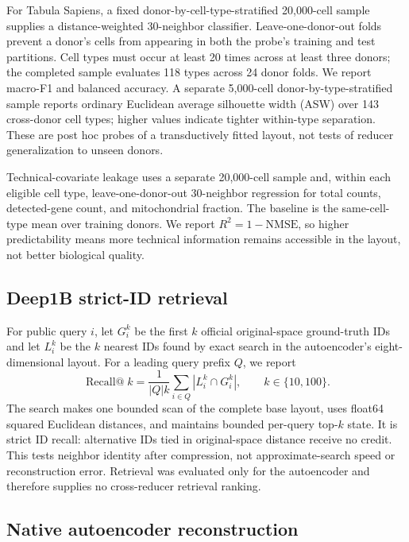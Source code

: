 \documentclass[10pt]{article}
\begin{document}
For Tabula Sapiens, a fixed donor-by-cell-type-stratified 20,000-cell sample supplies a
distance-weighted 30-neighbor classifier.  Leave-one-donor-out folds prevent a donor's
cells from appearing in both the probe's training and test partitions.  Cell types must
occur at least 20 times across at least three donors; the completed sample evaluates 118
types across 24 donor folds.  We report macro-F1 and balanced accuracy.  A separate
5,000-cell donor-by-type-stratified sample reports ordinary Euclidean average silhouette
width (ASW) over 143 cross-donor cell types; higher values indicate tighter
within-type separation.  These are post hoc probes of a transductively fitted layout,
not tests of reducer generalization to unseen donors.

Technical-covariate leakage uses a separate 20,000-cell sample and, within each eligible
cell type, leave-one-donor-out 30-neighbor regression for total counts, detected-gene
count, and mitochondrial fraction.  The baseline is the same-cell-type mean over
training donors.  We report $R^2=1-\mathrm{NMSE}$, so higher predictability means more
technical information remains accessible in the layout, not better biological quality.

\subsection{Deep1B strict-ID retrieval}

For public query $i$, let $G_i^k$ be the first $k$ official original-space
ground-truth IDs and let $L_i^k$ be the $k$ nearest IDs found by exact search in the
autoencoder's eight-dimensional layout.  For a leading query prefix $Q$, we report
\begin{equation}
 \operatorname{Recall@}k
 =\frac{1}{|Q|k}\sum_{i\in Q}\left|L_i^k\cap G_i^k\right|,
 \qquad k\in\{10,100\}.
 \label{eq:deep-recall}
\end{equation}
The search makes one bounded scan of the complete base layout, uses float64 squared
Euclidean distances, and maintains bounded per-query top-$k$ state.  It is strict ID
recall: alternative IDs tied in original-space distance receive no credit.  This tests
neighbor identity after compression, not approximate-search speed or reconstruction
error.  Retrieval was evaluated only for the autoencoder and therefore supplies no
cross-reducer retrieval ranking.

\subsection{Native autoencoder reconstruction}
\end{document}
